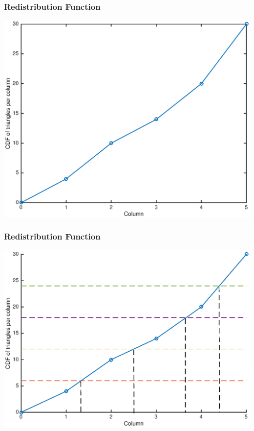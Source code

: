 \documentclass[compress]{beamer}
\begin{document}
\begin{frame}[t]\frametitle{Redistribution Function}
\centering
\includegraphics[scale = 0.5]{figures/before_redistribute.eps}
\end{frame}

\begin{frame}[t]\frametitle{Redistribution Function}
\centering
\includegraphics[scale = 0.5]{figures/after_redistribute.eps}
\end{frame}
\end{document}
